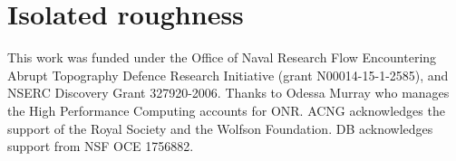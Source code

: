 \documentclass[twocol]{ametsocV5}
\begin{document}
\clearpage

\section{Isolated roughness}



\acknowledgments

This work was funded under the Office of Naval Research Flow Encountering Abrupt Topography Defence Research Initiative (grant N00014-15-1-2585), and NSERC Discovery Grant 327920-2006.  Thanks to Odessa Murray who manages the High Performance Computing accounts for ONR. ACNG acknowledges the support of the Royal Society and the Wolfson Foundation.  DB acknowledges support from NSF OCE 1756882.


%
%
%
%
%
%








%
\end{document}
